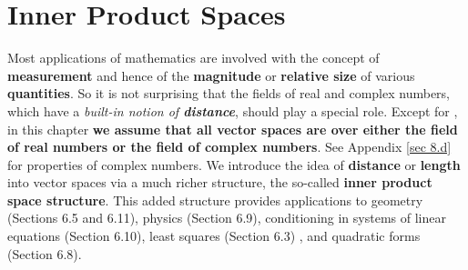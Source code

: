 \chapter{Inner Product Spaces} \label{ch 6}

Most applications of mathematics are involved with the concept of \textbf{measurement} and hence of the \textbf{magnitude} or \textbf{relative size} of various \textbf{quantities}.
So it is not surprising that the fields of real and complex numbers, which have a \emph{built-in notion of \textbf{distance}}, should play a special role.
Except for , in this chapter \textbf{we assume that all vector spaces are over either the field of real numbers or the field of complex numbers}.
See Appendix \ref{sec 8.d} for properties of complex numbers.
We introduce the idea of \textbf{distance} or \textbf{length} into vector spaces via a much richer structure, the so-called \textbf{inner product space structure}.
This added structure provides applications to geometry (Sections 6.5 and 6.11), physics (Section 6.9), conditioning in systems of linear equations (Section 6.10), least squares (Section 6.3) , and quadratic forms (Section 6.8).











